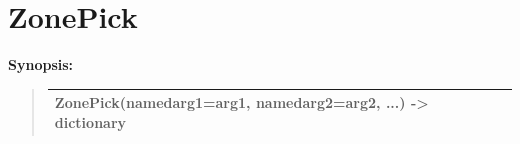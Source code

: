 \documentclass[letterpaper,10pt,english]{sphinxmanual}
\begin{document}
\section{ZonePick}
\label{functions:zonepick}
\begin{DUlineblock}{0em}
\item[] \textbf{Synopsis:}
\end{DUlineblock}
\begin{quote}

\begin{tabulary}{\linewidth}{|L|}
\hline

ZonePick(namedarg1=arg1, namedarg2=arg2, ...) -\textgreater{} dictionary
\\
\hline\end{tabulary}

\end{quote}
\end{document}
